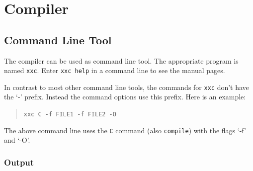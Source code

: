 \documentclass[a5paper]{report}
\def\xxc{\texttt{xxc}\xspace}
\begin{document}

\chapter{Compiler}



\section{Command Line Tool}

The compiler can be used as command line tool. The appropriate program is named \xxc.
Enter \texttt{xxc help} in a command line to see the manual pages.

In contrast to most other command line tools, the commands for \xxc don't have the `-' prefix.
Instead the command options use this prefix. Here is an example:
\begin{quote}
\texttt{xxc C -f FILE1 -f FILE2 -O}
\end{quote}
The above command line uses the \texttt{C} command (also \texttt{compile}) with the flags `-f' and `-O'.

\subsection{Output}
\end{document}
